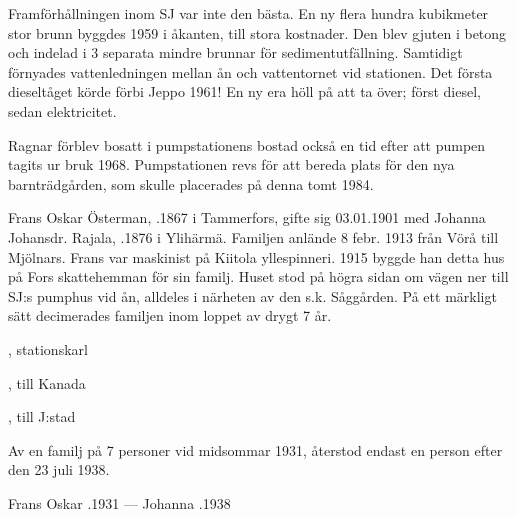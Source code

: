 Framförhållningen inom SJ var inte den bästa. En ny flera hundra kubikmeter stor brunn byggdes 1959 i åkanten, till stora kostnader. Den blev gjuten i betong och indelad i 3 separata mindre brunnar för sedimentutfällning. Samtidigt förnyades vattenledningen mellan ån och vattentornet vid stationen. Det första dieseltåget körde förbi Jeppo 1961! En ny era höll på att ta över; först diesel, sedan elektricitet.

Ragnar förblev bosatt i  pumpstationens bostad också en tid efter att pumpen tagits ur bruk 1968. Pumpstationen revs för att bereda plats för den nya barnträdgården, som skulle placerades på denna tomt 1984.



%



%
Frans Oskar Österman, .1867 i Tammerfors, gifte sig 03.01.1901 med Johanna Johansdr. Rajala, .1876 i Ylihärmä. Familjen anlände 8 febr. 1913 från Vörå till Mjölnars. Frans var maskinist på Kiitola yllespinneri. 1915 byggde han detta hus på Fors skattehemman för sin familj. Huset stod på högra sidan om vägen ner till SJ:s pumphus vid ån, alldeles i närheten av den s.k. Såggården. På ett märkligt sätt decimerades familjen inom loppet av drygt 7 år.
\begin{jhchildren}
  \item {}
  \item {}, stationskarl
  \item {}, till Kanada
  \item {}, till J:stad
  \item {}
\end{jhchildren}
Av en familj på 7 personer vid midsommar 1931, återstod endast en person efter den 23 juli 1938.

Frans Oskar .1931  ---  Johanna .1938

